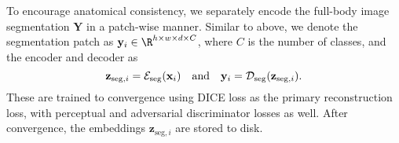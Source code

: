 To encourage anatomical consistency, we separately encode the full-body image segmentation $\mathbf{Y}$ in a patch-wise manner.
Similar to above, we denote the segmentation patch as $\mathbf{y}_i \in \R^{h \times w \times d \times C}$, where $C$ is the number of classes, and the encoder and decoder as
\begin{equation}
  \label{eq:5}
  \mathbf{z}_{\mathrm{seg}, i} = \mathcal{E}_{\rm seg}(\mathbf{x}_i) \text{~~~and~~~} \mathbf{y}_i = \mathcal{D}_{\rm seg}(\mathbf{z}_{\mathrm{seg}, i}).
\end{equation}
These are trained to convergence using DICE loss as the primary reconstruction loss, with perceptual and adversarial discriminator losses as well.\cite{esser2020taming} After convergence, the embeddings $\mathbf{z}_{\mathrm{seg},i}$ are stored to disk.
